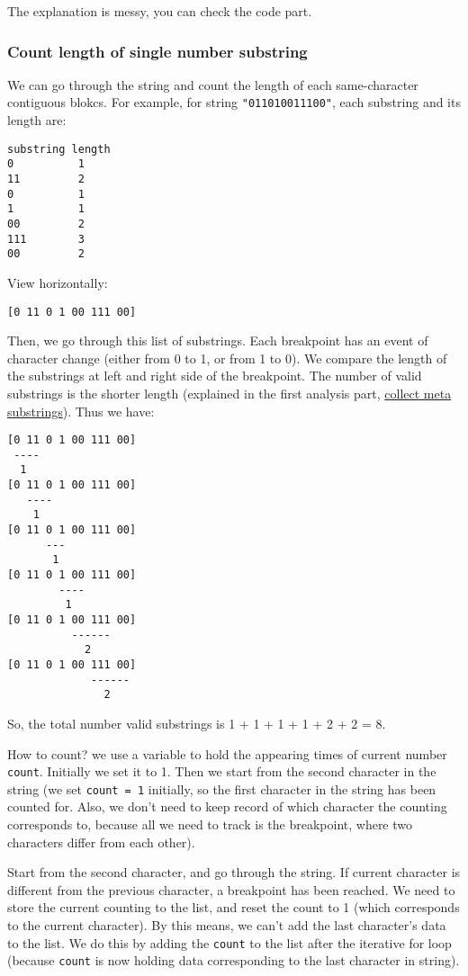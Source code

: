 \documentclass[11pt]{article}
\begin{document}
The explanation is messy, you can check the code part.
\subsubsection{Count length of single number substring}
\label{sec:orgffd3e63}
We can go through the string and count the length of each same-character contiguous blokcs. For example, for string \texttt{"011010011100"}, each substring and its length are:
\begin{Verbatim}[frame=single]
substring length
0          1
11         2
0          1
1          1
00         2
111        3
00         2
\end{Verbatim}
View horizontally:
\begin{Verbatim}[frame=single]
[0 11 0 1 00 111 00]
\end{Verbatim}
Then, we go through this list of substrings. Each breakpoint has an event of character change (either from 0 to 1, or from 1 to 0). We compare the length of the substrings at left and right side of the breakpoint. The number of valid substrings is the shorter length (explained in the first analysis part, \hyperref[org8ee496f]{collect meta substrings}). Thus we have:
\begin{Verbatim}[frame=single]
[0 11 0 1 00 111 00]
 ----
  1
[0 11 0 1 00 111 00]
   ----
    1
[0 11 0 1 00 111 00]
      ---
       1
[0 11 0 1 00 111 00]
        ----
         1
[0 11 0 1 00 111 00]
          ------
            2
[0 11 0 1 00 111 00]
             ------
               2
\end{Verbatim}
So, the total number valid substrings is 1 + 1 + 1 + 1 + 2 + 2 = 8.

How to count? we use a variable to hold the appearing times of current number \texttt{count}. Initially we set it to 1. Then we start from the second character in the string (we set \texttt{count = 1} initially, so the first character in the string has been counted for. Also, we don't need to keep record of which character the counting corresponds to, because all we need to track is the breakpoint, where two characters differ from each other).

Start from the second character, and go through the string. If current character is different from the previous character, a breakpoint has been reached. We need to store the current counting to the list, and reset the count to 1 (which corresponds to the current character). By this means, we can't add the last character's data to the list. We do this by adding the \texttt{count} to the list after the iterative for loop (because \texttt{count} is now holding data corresponding to the last character in string).
\end{document}
